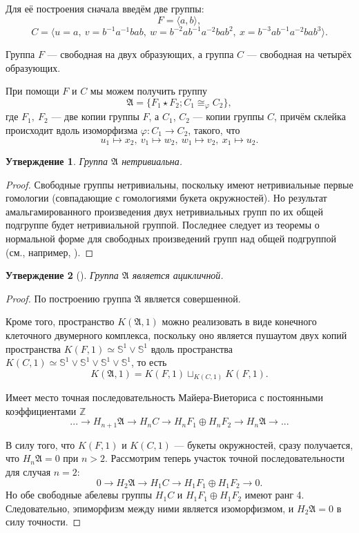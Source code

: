 \documentclass[14pt, dvipsnames, twoside]{extarticle}
\newtheorem{statement}{Утверждение}
\theoremstyle{definition}
\theoremstyle{remark}
\begin{document}
Для её построения сначала введём две группы: $$F=\langle a, b \rangle,$$ $$C=\langle u=a,\ v=b^{-1}a^{-1}bab,\ w=b^{-2}ab^{-1}a^{-2}bab^2,\ x= b^{-3}ab^{-1}a^{-2}bab^3 \rangle.$$

Группа $F$ --- свободная на двух образующих, а группа $C$ --- свободная на четырёх образующих.

При помощи $F$ и $C$ мы можем получить группу $$\mathfrak{A}=\{ F_1\star F_2; C_1\cong_\varphi C_2\},$$ где $F_1, \ F_2$ --- две копии группы $F$, а $C_1$, $C_2$ --- копии группы $C$, причём склейка происходит вдоль изоморфизма $\varphi: C_1\to C_2$, такого, что $$u_1\mapsto x_2,\ v_1\mapsto w_2,\ w_1\mapsto v_2,\ x_1\mapsto u_2.$$ 

\begin{statement}
Группа $\mathfrak{A}$ нетривиальна.
\end{statement} 

\begin{proof}
Свободные группы нетривиальны, поскольку имеют нетривиальные первые гомологии (совпадающие с гомологиями букета окружностей). Но результат амальгамированного произведения двух нетривиальных групп по их общей подгруппе будет нетривиальной группой. Последнее следует из теоремы о нормальной форме для свободных произведений групп над общей подгруппой (см., например, \cite{Serre}).
\end{proof}

\begin{statement}[\cite{BDH}] 
Группа $\mathfrak{A}$ является ацикличной.
\end{statement}

\begin{proof}

По построению группа $\mathfrak{A}$ является совершенной.

Кроме того, пространство $K(\mathfrak{A}, 1)$ можно реализовать в виде конечного клеточного двумерного комплекса, поскольку оно является пушаутом двух копий пространства $K(F, 1)\simeq \mathbb{S}^1\vee \mathbb{S}^1$ вдоль пространства $K(C, 1)\simeq \mathbb{S}^1\vee\mathbb{S}^1\vee\mathbb{S}^1\vee\mathbb{S}^1$, то есть $$K(\mathfrak{A}, 1)=K(F, 1)\sqcup_{K(C, 1)} K(F, 1).$$ 

Имеет место точная последовательность Майера-Виеториса с постоянными коэффициентами $\mathbb{Z}$ 
$$...\to H_{n+1}\mathfrak{A}\to H_nC\to H_nF_1\oplus H_n F_2\to H_n\mathfrak{A}\to ...$$

В силу того, что $K(F, 1)$ и $K(C, 1)$ --- букеты окружностей, сразу получается, что $H_n\mathfrak{A}=0$ при $n>2$. Рассмотрим теперь участок точной последовательности для случая $n=2$: 
$$0\to H_2\mathfrak{A}\to H_1C\to H_1F_1\oplus H_1F_2\to 0.$$ Но обе свободные абелевы группы $H_1C$ и $H_1F_1\oplus H_1 F_2$ имеют ранг 4. Следовательно, эпиморфизм между ними является изоморфизмом, и $H_2\mathfrak{A}=0$ в силу точности.


\end{proof}
\end{document}
